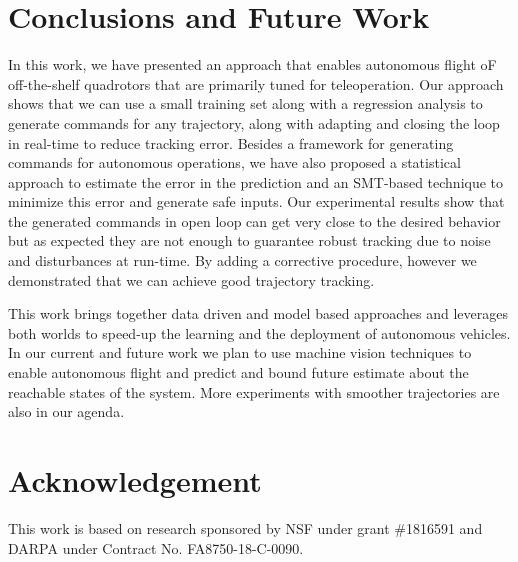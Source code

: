 \documentclass[letterpaper, 10 pt, conference]{ieeeconf}  %
\begin{document}
\section{Conclusions and Future Work} \label{sec:conc}
In this work, we have presented an approach that enables autonomous flight oF off-the-shelf quadrotors that are primarily tuned for teleoperation. Our approach shows that we can use a small training set along with a regression analysis to generate commands for any trajectory, along with adapting and closing the loop in real-time to reduce tracking error. Besides a framework for generating commands for autonomous operations, we have also proposed a statistical approach to estimate the error in the prediction and an SMT-based technique to minimize this error and generate safe inputs. Our experimental results show that the generated commands in open loop can get very close to the desired behavior but as expected they are not enough to guarantee robust tracking due to noise and disturbances at run-time. By adding a corrective procedure, however we demonstrated that we can achieve good trajectory tracking. 

This work brings together data driven and model based approaches and leverages both worlds to speed-up the learning and the deployment of autonomous vehicles.
In our current and future work we plan to use machine vision techniques to enable autonomous flight and predict and bound future estimate about the reachable states of the system. More experiments with smoother trajectories are also in our agenda.






\section{Acknowledgement}
This work is based on research sponsored by NSF under grant \#1816591 and DARPA under Contract No. FA8750-18-C-0090.









\end{document}
